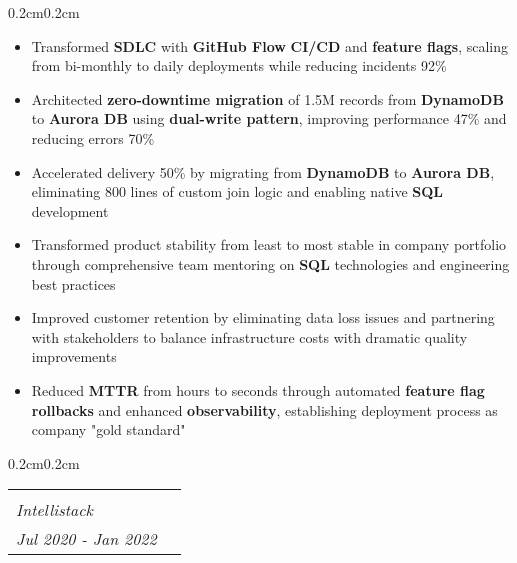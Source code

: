 \documentclass[10pt, letterpaper]{article}
\makeatletter
\newenvironment{highlights}{
    \begin{itemize}[
        topsep=0.10 cm,
        parsep=0.10 cm,
        partopsep=0pt,
        itemsep=0pt,
        leftmargin=0.4 cm + 10pt
    ]
}{
    \end{itemize}
}
\newenvironment{onecolentry}{
    \begin{adjustwidth}{0.2cm}{0.2cm}
}{
    \end{adjustwidth}
}
\newcommand{\jobentry}[4]{
    \begin{onecolentry}
        \noindent
        \begin{tabularx}{\textwidth}{@{}X>{\raggedleft\arraybackslash}p{3cm}@{\hspace{0.2cm}}}
            \begin{tabular}[t]{@{}l@{}}
                \textbf{#1}\\
                \textit{#2}
            \end{tabular} &
            \begin{tabular}[t]{@{}r@{}}
                #4\\
                \textit{#3}
            \end{tabular}
        \end{tabularx}
    \end{onecolentry}
}
\makeatother
\begin{document}
    \vspace{0.10cm}
    \begin{onecolentry}
        \begin{highlights}
            \item Transformed \textbf{SDLC} with \textbf{GitHub Flow} \textbf{CI/CD} and \textbf{feature flags}, scaling from bi-monthly to daily deployments while reducing incidents 92\%
            \item Architected \textbf{zero-downtime migration} of 1.5M records from \textbf{DynamoDB} to \textbf{Aurora DB} using \textbf{dual-write pattern}, improving performance 47\% and reducing errors 70\%
            \item Accelerated delivery 50\% by migrating from \textbf{DynamoDB} to \textbf{Aurora DB}, eliminating 800 lines of custom join logic and enabling native \textbf{SQL} development
            \item Transformed product stability from least to most stable in company portfolio through comprehensive team mentoring on \textbf{SQL} technologies and engineering best practices
            \item Improved customer retention by eliminating data loss issues and partnering with stakeholders to balance infrastructure costs with dramatic quality improvements
            \item Reduced \textbf{MTTR} from hours to seconds through automated \textbf{feature flag rollbacks} and enhanced \textbf{observability}, establishing deployment process as company "gold standard"
        \end{highlights}
    \end{onecolentry}
    
    \vspace{0.3cm}
    \jobentry{Senior Software Developer}{Intellistack}{Jul 2020 - Jan 2022}{Remote}
\end{document}
